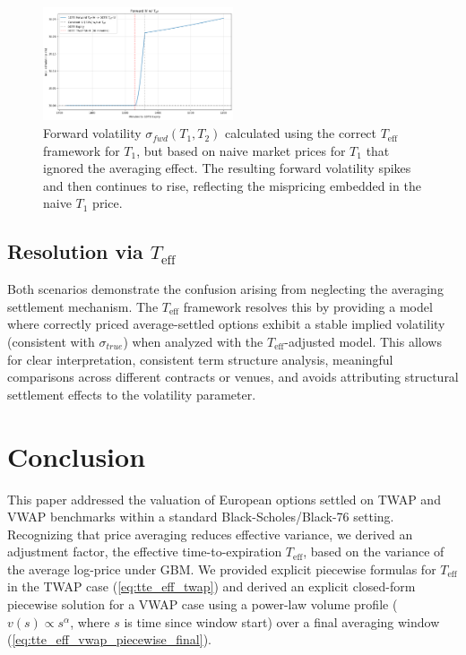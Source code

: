 \documentclass[11pt]{article}
\theoremstyle{plain}
\begin{document}
\begin{figure}[H]
    \centering
    \includegraphics[width=0.5\textwidth]{png5.png}
    \caption{Forward volatility $\sigma_{fwd}(T_1, T_2)$ calculated using the correct $T_{\mathrm{eff}}$ framework for $T_1$, but based on naive market prices for $T_1$ that ignored the averaging effect. The resulting forward volatility spikes and then continues to rise, reflecting the mispricing embedded in the naive $T_1$ price.}
    \label{fig:teff_fwd_vol_spike}
\end{figure}



\subsection{Resolution via $T_{\mathrm{eff}}$}

Both scenarios demonstrate the confusion arising from neglecting the averaging settlement mechanism. The $T_{\mathrm{eff}}$ framework resolves this by providing a model where correctly priced average-settled options exhibit a stable implied volatility (consistent with $\sigma_{true}$) when analyzed with the $T_{\mathrm{eff}}$-adjusted model. This allows for clear interpretation, consistent term structure analysis, meaningful comparisons across different contracts or venues, and avoids attributing structural settlement effects to the volatility parameter.



\section{Conclusion}
\label{sec:conclusion}
This paper addressed the valuation of European options settled on TWAP and VWAP benchmarks within a standard Black-Scholes/Black-76 setting. Recognizing that price averaging reduces effective variance, we derived an adjustment factor, the effective time-to-expiration $T_{\mathrm{eff}}$, based on the variance of the average log-price under GBM. We provided explicit piecewise formulas for $T_{\mathrm{eff}}$ in the TWAP case (\cref{eq:tte_eff_twap}) and derived an explicit closed-form piecewise solution for a VWAP case using a power-law volume profile ($v(s) \propto s^\alpha$, where $s$ is time since window start) over a final averaging window (\cref{eq:tte_eff_vwap_piecewise_final}).
\end{document}
